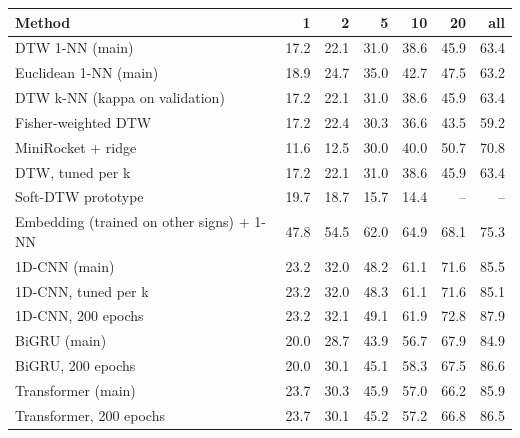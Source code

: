 \begin{tabular}{lrrrrrr}
\toprule
Method & 1 & 2 & 5 & 10 & 20 & all \\
\midrule
DTW 1-NN (main) & 17.2 & 22.1 & 31.0 & 38.6 & 45.9 & 63.4 \\
Euclidean 1-NN (main) & 18.9 & 24.7 & 35.0 & 42.7 & 47.5 & 63.2 \\
DTW k-NN (kappa on validation) & 17.2 & 22.1 & 31.0 & 38.6 & 45.9 & 63.4 \\
Fisher-weighted DTW & 17.2 & 22.4 & 30.3 & 36.6 & 43.5 & 59.2 \\
MiniRocket + ridge & 11.6 & 12.5 & 30.0 & 40.0 & 50.7 & 70.8 \\
DTW, tuned per k & 17.2 & 22.1 & 31.0 & 38.6 & 45.9 & 63.4 \\
Soft-DTW prototype & 19.7 & 18.7 & 15.7 & 14.4 & -- & -- \\
Embedding (trained on other signs) + 1-NN & 47.8 & 54.5 & 62.0 & 64.9 & 68.1 & 75.3 \\
1D-CNN (main) & 23.2 & 32.0 & 48.2 & 61.1 & 71.6 & 85.5 \\
1D-CNN, tuned per k & 23.2 & 32.0 & 48.3 & 61.1 & 71.6 & 85.1 \\
1D-CNN, 200 epochs & 23.2 & 32.1 & 49.1 & 61.9 & 72.8 & 87.9 \\
BiGRU (main) & 20.0 & 28.7 & 43.9 & 56.7 & 67.9 & 84.9 \\
BiGRU, 200 epochs & 20.0 & 30.1 & 45.1 & 58.3 & 67.5 & 86.6 \\
Transformer (main) & 23.7 & 30.3 & 45.9 & 57.0 & 66.2 & 85.9 \\
Transformer, 200 epochs & 23.7 & 30.1 & 45.2 & 57.2 & 66.8 & 86.5 \\
\bottomrule
\end{tabular}
